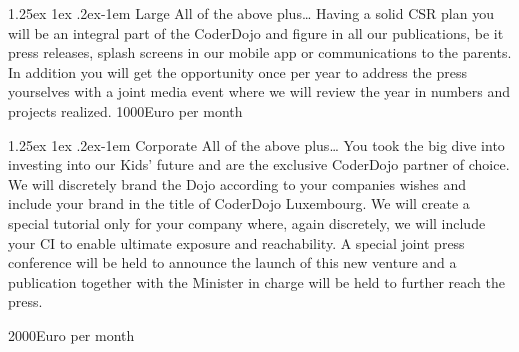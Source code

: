 \documentclass{proposal}
\makeatletter
\renewcommand{\paragraph}{
  \@startsection{paragraph}{4}
    {\z@}{1.25ex \@plus 1ex \@minus .2ex}{-1em}
      {\normalfont\normalsize\bfseries}
      }
\makeatother
\begin{document}
\paragraph{Large}
All of the above plus\ldots
Having a solid CSR plan you will be an integral part of the CoderDojo and figure in all our publications, be it press releases, splash screens in our mobile app or communications to the parents.
In addition you will get the opportunity once per year to address the press yourselves with a joint media event where we will review the year in numbers and projects realized.
1000Euro per month

\paragraph{Corporate}
All of the above plus\ldots
You took the big dive into investing into our Kids' future and are the exclusive CoderDojo partner of choice. We will discretely brand the Dojo according to your companies wishes and include your brand in the title of CoderDojo Luxembourg.
We will create a special tutorial only for your company where, again discretely, we will include your CI to enable ultimate exposure and reachability.
A special joint press conference will be held to announce the launch of this new venture and a publication together with the Minister in charge will be held to further reach the press.

2000Euro per month

\ \\
\end{document}
